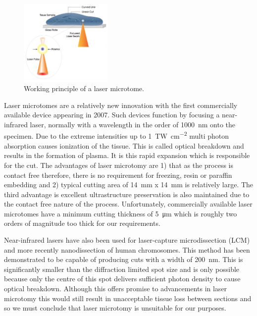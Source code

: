 \documentclass[a4paper, 11pt]{article}
\numberwithin{equation}{section}
\begin{document}
	\begin{figure}[h]
		\centering
		\includegraphics[width=0.4\textwidth]{laser_microtome}
		\caption{Working principle of a laser microtome\cite{lubatschowski2007laser}.}
		\label{laser_microtome}
	\end{figure}
	
	Laser microtomes are a relatively new innovation with the first commercially available device appearing in 2007. Such devices function by focusing a near-infrared laser, normally with a wavelength in the order of \SI{1000}{\nano\meter} onto the specimen. Due to the extreme intensities up to \SI{1}{\tera\watt\per\centi\meter\squared} multi photon absorption causes ionization of the tissue. This is called optical breakdown and results in the formation of plasma. It is this rapid expansion which is responsible for the cut\cite{lubatschowski2007laser}. The advantages of laser microtomy are 1) that as the process is contact free therefore, there is no requirement for freezing, resin or paraffin embedding and 2) typical cutting area of \SI{14}{\milli\meter} x \SI{14}{\milli\meter} is relatively large. The third advantage is excellent ultrastructure preservation is also maintained due to the contact free nature of the process. Unfortunately, commercially available laser microtomes have a minimum cutting thickness of \SI{5}{\micro\metre} which is roughly two orders of magnitude too thick for our requirements.
	
	Near-infrared lasers have also been used for laser-capture microdissection (LCM) and more recently nanodissection of human chromosomes. This method has been demonstrated to be capable of producing cuts with a width of \SI{200}{\nano\meter}\cite{konig2001nanodissection}. This is significantly smaller than the diffraction limited spot size and is only possible because only the centre of this spot delivers sufficient photon density to cause optical breakdown. Although this offers promise to advancements in laser microtomy this would still result in unacceptable tissue loss between sections and so we must conclude that laser microtomy is unsuitable for our purposes.
\end{document}
